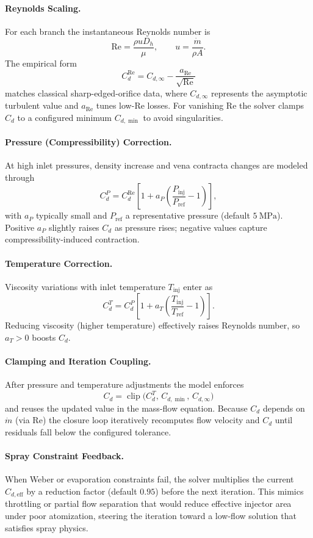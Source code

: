 \documentclass[12pt]{article}
\begin{document}
\paragraph{Reynolds Scaling.}  For each branch the instantaneous Reynolds number is
\[
\text{Re} = \frac{\rho u D_h}{\mu}, \qquad u = \frac{\dot{m}}{\rho A}.
\]
The empirical form
\[
C_d^{\text{Re}} = C_{d,\infty} - \frac{a_{\text{Re}}}{\sqrt{\text{Re}}}
\]
matches classical sharp-edged-orifice data, where $C_{d,\infty}$ represents the asymptotic turbulent value and $a_{\text{Re}}$ tunes low-Re losses.  For vanishing $\text{Re}$ the solver clamps $C_d$ to a configured minimum $C_{d,\min}$ to avoid singularities.

\paragraph{Pressure (Compressibility) Correction.}  At high inlet pressures, density increase and vena contracta changes are modeled through
\[
C_d^{P} = C_d^{\text{Re}} \left[ 1 + a_P \left(\frac{P_{\text{inj}}}{P_{\text{ref}}} - 1 \right) \right],
\]
with $a_P$ typically small and $P_{\text{ref}}$ a representative pressure (default $5\ \text{MPa}$).  Positive $a_P$ slightly raises $C_d$ as pressure rises; negative values capture compressibility-induced contraction.

\paragraph{Temperature Correction.}  Viscosity variations with inlet temperature $T_{\text{inj}}$ enter as
\[
C_d^{T} = C_d^{P} \left[ 1 + a_T \left(\frac{T_{\text{inj}}}{T_{\text{ref}}} - 1 \right) \right].
\]
Reducing viscosity (higher temperature) effectively raises Reynolds number, so $a_T > 0$ boosts $C_d$.

\paragraph{Clamping and Iteration Coupling.}  After pressure and temperature adjustments the model enforces
\[
C_d = \operatorname{clip}\bigl(C_d^{T},\, C_{d,\min},\, C_{d,\infty}\bigr)
\]
and reuses the updated value in the mass-flow equation.  Because $C_d$ depends on $\dot{m}$ (via $\text{Re}$) the closure loop iteratively recomputes flow velocity and $C_d$ until residuals fall below the configured tolerance.

\paragraph{Spray Constraint Feedback.}  When Weber or evaporation constraints fail, the solver multiplies the current $C_{d,\text{eff}}$ by a reduction factor (default $0.95$) before the next iteration.  This mimics throttling or partial flow separation that would reduce effective injector area under poor atomization, steering the iteration toward a low-flow solution that satisfies spray physics.
\end{document}
